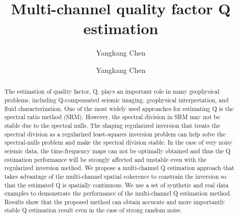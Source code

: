 

\title{Multi-channel quality factor Q estimation}
\author{Yangkang Chen}

\renewcommand{\thefootnote}{\fnsymbol{footnote}}

\author{Yangkang Chen\footnotemark[1]}



\address{
\footnotemark[1]
School of Earth Sciences\\
Zhejiang University\\
Hangzhou, Zhejiang Province, China, 310027\\
yangkang.chen@zju.edu.cn 
}


\begin{abstract}
The estimation of quality factor, Q, plays an important role in many geophysical problems, including Q-compensated seismic imaging, geophysical interpretation, and fluid characterization. One of the most widely used approaches for estimating Q is the spectral ratio method (SRM). However, the spectral division in SRM may not be stable due to the spectral nulls. The shaping regularized inversion that treats the spectral division as a regularized least-squares inversion problem can help solve the spectral-nulls problem and make the spectral division stable. In the case of very noisy seismic data, the time-frequency maps can not be optimally obtained and thus the Q estimation performance will be strongly affected and unstable even with the regularized inversion method. We propose a multi-channel Q estimation approach that takes advantage of the multi-channel spatial coherence to constrain the inversion so that the estimated Q is spatially continuous. We use a set of synthetic and real data examples to demonstrate the performance of the multi-channel Q estimation method. Results show that the proposed method can obtain accurate and more importantly stable Q estimation result even in the case of strong random noise.
\end{abstract}


